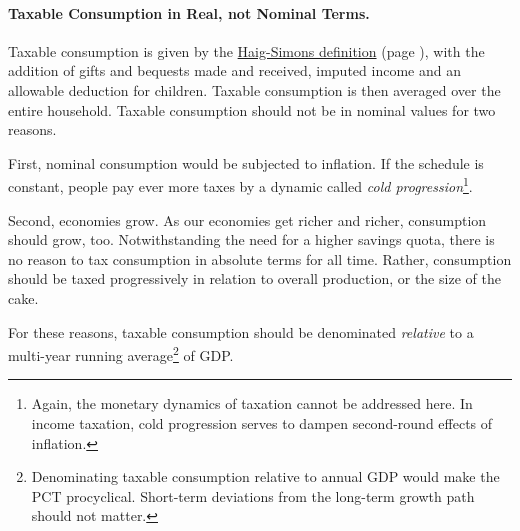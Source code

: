 \paragraph{Taxable Consumption in Real, not Nominal Terms.} Taxable consumption is given by the \hyperref[eq:HaigSimonsPCT]{Haig-Simons definition} (page \pageref{eq:HaigSimonsPCT}), with the addition of gifts and bequests made and received, imputed income and an allowable deduction for children. Taxable consumption is then averaged over the entire household. Taxable consumption should not be in nominal values for two reasons.

First, nominal consumption would be subjected to inflation. If the schedule is constant, people pay ever more taxes by a dynamic called \emph{cold progression}\footnote{
	Again, the monetary dynamics of taxation cannot be addressed here. In income taxation, cold progression serves to dampen second-round effects of inflation.}.

Second, economies grow. As our economies get richer and richer, consumption should grow, too. Notwithstanding the need for a higher savings quota, there is no reason to tax consumption in absolute terms for all time. Rather, consumption should be taxed progressively in relation to overall production, or the size of the cake.

For these reasons, taxable consumption should be denominated \emph{relative} to a multi-year running average\footnote{
	Denominating taxable consumption relative to annual GDP would make the PCT procyclical. Short-term deviations from the long-term growth path should not matter.} 
of GDP. 

